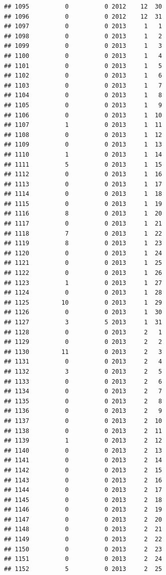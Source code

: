 \documentclass[
]{article}
\begin{document}
\begin{verbatim}
## 1095          0          0 2012    12  30
## 1096          0          0 2012    12  31
## 1097          0          0 2013     1   1
## 1098          0          0 2013     1   2
## 1099          0          0 2013     1   3
## 1100          0          0 2013     1   4
## 1101          0          0 2013     1   5
## 1102          0          0 2013     1   6
## 1103          0          0 2013     1   7
## 1104          0          0 2013     1   8
## 1105          0          0 2013     1   9
## 1106          0          0 2013     1  10
## 1107          1          0 2013     1  11
## 1108          0          0 2013     1  12
## 1109          0          0 2013     1  13
## 1110          1          0 2013     1  14
## 1111          5          0 2013     1  15
## 1112          0          0 2013     1  16
## 1113          0          0 2013     1  17
## 1114          0          0 2013     1  18
## 1115          0          0 2013     1  19
## 1116          8          0 2013     1  20
## 1117          0          0 2013     1  21
## 1118          7          0 2013     1  22
## 1119          8          0 2013     1  23
## 1120          0          0 2013     1  24
## 1121          0          0 2013     1  25
## 1122          0          0 2013     1  26
## 1123          1          0 2013     1  27
## 1124          0          0 2013     1  28
## 1125         10          0 2013     1  29
## 1126          0          0 2013     1  30
## 1127          3          5 2013     1  31
## 1128          0          0 2013     2   1
## 1129          0          0 2013     2   2
## 1130         11          0 2013     2   3
## 1131          0          0 2013     2   4
## 1132          3          0 2013     2   5
## 1133          0          0 2013     2   6
## 1134          0          0 2013     2   7
## 1135          0          0 2013     2   8
## 1136          0          0 2013     2   9
## 1137          0          0 2013     2  10
## 1138          0          0 2013     2  11
## 1139          1          0 2013     2  12
## 1140          0          0 2013     2  13
## 1141          0          0 2013     2  14
## 1142          0          0 2013     2  15
## 1143          0          0 2013     2  16
## 1144          0          0 2013     2  17
## 1145          0          0 2013     2  18
## 1146          0          0 2013     2  19
## 1147          0          0 2013     2  20
## 1148          0          0 2013     2  21
## 1149          0          0 2013     2  22
## 1150          0          0 2013     2  23
## 1151          0          0 2013     2  24
## 1152          5          0 2013     2  25

\end{verbatim}
\end{document}
